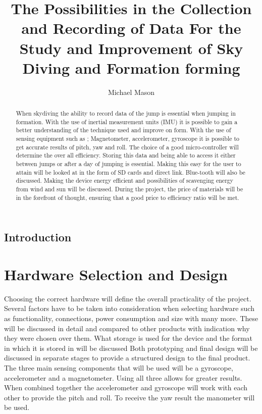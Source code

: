 \documentclass{report}
\begin{document}
\title{The Possibilities in the Collection and Recording of Data For the Study and Improvement of Sky Diving and Formation forming}
\author{Michael Mason}

\maketitle

\begin{abstract}
When skydiving the ability to record data of the jump is essential when jumping in formation. With the use of inertial measurement units (IMU) it is possible to gain a better understanding of the technique used and improve on form. With the use of sensing equipment such as ; Magnetometer, accelerometer, gyroscope it is possible to get accurate results of pitch, yaw and roll. The choice of a good micro-controller will determine the over all efficiency.
Storing this data and being able to access it either between jumps or after a day of jumping is essential. Making this easy for the user to attain will be looked at in the form of SD cards and direct link. Blue-tooth will also be discussed.
Making the device energy efficient and possibilities of scavenging energy from wind and sun will be discussed. During the project, the price of materials will be in the forefront of thought, ensuring that a good price to efficiency ratio will be met.

\end{abstract}

\tableofcontents

\newpage

\section{Introduction}


\chapter{Hardware Selection and Design}
Choosing the correct hardware will define the overall practicality of the project. Several factors have to be taken into consideration when selecting hardware such as functionality, connections, power consumption and size with many more. These will be discussed in detail and compared to other products with indication why they were chosen over them. What storage is used for the device and the format in which it is stored in will be discussed
Both prototyping and final design will be discussed in separate stages to provide a structured design to the final product.
The three main sensing components that will be used will be a gyroscope, accelerometer and a magnetometer. Using all three allows for greater results. When combined together the accelerometer and gyroscope will work with each other to provide the pitch and roll. To receive the yaw result the manometer will be used.
\end{document}

